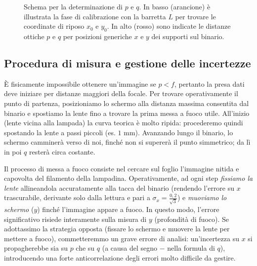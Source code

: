 \documentclass[openany,a4paper,12pt]{book}
\begin{document}
\begin{figure}[H]
\caption{Schema per la determinazione di $p$ e $q$. In basso (arancione) è illustrata la fase di calibrazione con la barretta $L$ per trovare le coordinate di riposo $x_0$ e $y_0$. In alto (rosso) sono indicate le distanze ottiche $p$ e $q$ per posizioni generiche $x$ e $y$ dei supporti sul binario.}
\label{fig:calibrazione_coordinate}
\end{figure}

\subsection*{Procedura di misura e gestione delle incertezze}
È fisicamente impossibile ottenere un'immagine se $p < f$, pertanto la presa dati deve iniziare per distanze maggiori della focale. Per trovare operativamente il punto di partenza, posizioniamo lo schermo alla distanza massima consentita dal binario e spostiamo la lente fino a trovare la prima messa a fuoco utile. All'inizio (lente vicina alla lampada) la curva teorica è molto ripida: procederemo quindi spostando la lente a passi piccoli (es. $1 \text{ mm}$). Avanzando lungo il binario, lo schermo camminerà verso di noi, finché non si supererà il punto simmetrico; da lì in poi $q$ resterà circa costante. 

Il processo di messa a fuoco consiste nel cercare sul foglio l'immagine nitida e capovolta del filamento della lampadina. Operativamente, ad ogni step \textit{fissiamo la lente} allineandola accuratamente alla tacca del binario (rendendo l'errore su $x$ trascurabile, derivante solo dalla lettura e pari a $\sigma_x = \frac{0,2}{\sqrt{3}}$) e \textit{muoviamo lo schermo} ($y$) finché l'immagine appare a fuoco. 
In questo modo, l'errore significativo risiede interamente sulla misura di $y$ (profondità di fuoco). Se adottassimo la strategia opposta (fissare lo schermo e muovere la lente per mettere a fuoco), commetteremmo un grave errore di analisi: un'incertezza su $x$ si propagherebbe sia su $p$ che su $q$ (a causa del segno $-$ nella formula di $q$), introducendo una forte anticorrelazione degli errori molto difficile da gestire. 
\end{document}
